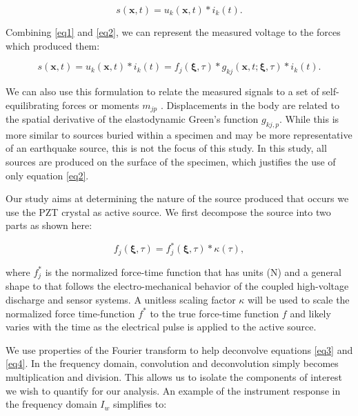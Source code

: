 \documentclass[preprint,3p, 11pt,authoryear]{elsarticle}
\begin{document}
    \begin{equation}
    \label{eq2}
        s\left( \mathbf{x}, t \right) =
            u_{k}\left( \mathbf{x}, t \right) \ast i_{k}\left(t \right).
    \end{equation}

\noindent Combining \eqref{eq1} and \eqref{eq2}, we can represent the measured voltage to the forces which produced them:

    \begin{equation}
    \label{eq3}
        s\left( \mathbf{x}, t \right) =
            u_{k}\left( \mathbf{x}, t \right) \ast i_{k}\left(t \right) =  
                f_{j}\left( \mathbf{\xi}, \tau \right) \ast 
                g_{kj}\left( \mathbf{x}, t;\mathbf{\xi}, \tau \right) \ast i_{k}\left( t \right).
    \end{equation}

\noindent We can also use this formulation to relate the measured signals to a set of self-equilibrating forces or moments $m_{jp}$ \citep{Aki2002}. Displacements in the body are related to the spatial derivative of the elastodynamic Green's function $g_{kj,p}$.  While this is more similar to sources buried within a specimen and may be more representative of an earthquake source, this is not the focus of this study.  In this study, all sources are produced on the surface of the specimen, which justifies the use of only equation \eqref{eq2}.

Our study aims at determining the nature of the source produced that occurs we use the PZT crystal as active source. We first decompose the source into two parts as shown here:

\begin{equation}
    \label{eq4}
    f_{j}\left( \mathbf{\xi}, \tau \right) = f^{*}_{j}\left( \mathbf{\xi}, \tau \right)  \ast \kappa \left( \tau \right),
\end{equation}

\noindent where $f^{*}_{j}$ is the normalized force-time function that has units (N) and a general shape to that follows the electro-mechanical behavior of the coupled high-voltage discharge and sensor systems.  A unitless scaling factor $\kappa$ will be used to scale the normalized force time-function $f^{*}$ to the true force-time function $f$ and likely varies with the time as the electrical pulse is applied to the active source.

We use properties of the Fourier transform \citep{Bracewell1986} to help deconvolve equations \eqref{eq3} and \eqref{eq4}.  In the frequency domain, convolution and deconvolution simply becomes multiplication and division. This allows us to isolate the components of interest we wish to quantify for our analysis. An example of the instrument response in the frequency domain $I_{w}$ simplifies to:
\end{document}
